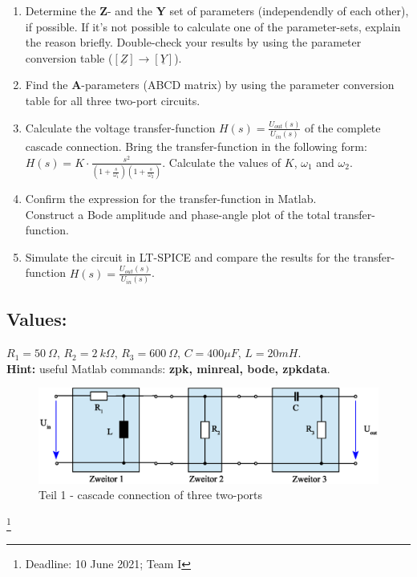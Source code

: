 \documentclass[a4paper]{article}
\newcommand\blfootnote[1]{%
	\begingroup
	\renewcommand\thefootnote{}\footnote{#1}%
	\addtocounter{footnote}{-1}%
	\endgroup
}
\begin{document}
	\begin{enumerate}
		\item Determine the \textbf{Z}- and the \textbf{Y} set of parameters (independendly of each other), if possible. If it's not possible to calculate one of the parameter-sets, explain the reason briefly. Double-check your results by using the parameter conversion table ($[\underline{Z}] \rightarrow [\underline{Y}]$).
		
		\item Find the \textbf{A}-parameters (ABCD matrix) by using the parameter conversion table for all three two-port circuits.

		\item Calculate the voltage transfer-function $H(s) = \frac{U_{out}(s)}{U_{in}(s)}$ of the complete cascade connection. Bring the transfer-function in the following form: $H(s) = K\cdot \frac{s^2}{(1+\frac{s}{\omega_1})(1+\frac{s}{\omega_2})}$. Calculate the values of $K$, $\omega_1$ and $\omega_2$.

		\item Confirm the expression for the transfer-function in Matlab. \\
		Construct a Bode amplitude and phase-angle plot of the total transfer-function. 
		
		\item Simulate the circuit in LT-SPICE and compare the results for the transfer-function $H(s) = \frac{U_{out}(s)}{U_{in}(s)}$. 
	\end{enumerate}

	\subsection*{Values:}
$R_1=50~\Omega $, $R_2=2~k\Omega$, $R_3=600~\Omega$, $C=400 \mu F$, $L=20mH$.
\vspace{0.5cm}\\
\textbf{\textbf{Hint:} }
useful Matlab commands: \textbf{zpk, minreal, bode, zpkdata}.
 	
 	\begin{figure}[h!]
 		\centering
 		\includegraphics[width=1\textwidth]{./Figures/homework9_circuit.eps}
 		\caption{Teil 1 - cascade connection of three two-ports}
 		\label{circuit}
 	\end{figure}
\vspace{3.5cm}
 	\blfootnote{Deadline: 10 June 2021; \qquad Team I}
\end{document}
